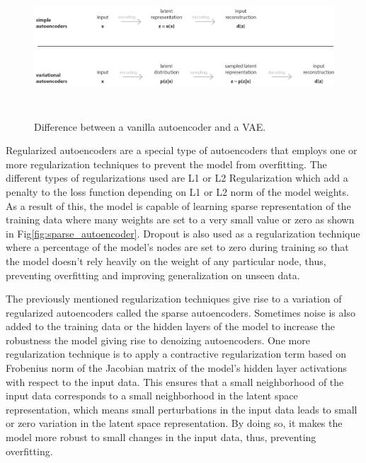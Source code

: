 \begin{figure}[t]
  \centering
  \includegraphics[width=400pt,height=150pt]{pictures/vae.png}
  \caption{Difference between a vanilla autoencoder and a \ac{VAE}.\cite{vae_image}}
  \label{fig:vae}
\end{figure} 
Regularized autoencoders are a special type of autoencoders that employs one or more regularization techniques to prevent the model from overfitting. The different types of regularizations used are L1 or L2 Regularization which add a penalty to the loss function depending on L1 or L2 norm of the model weights. As a result of this, the model is capable of learning sparse representation of the training data where many weights are set to a very small value or zero as shown in Fig\ref{fig:sparse_autoencoder}. Dropout is also used as a regularization technique where a percentage of the model's nodes are set to zero during training so that the model doesn't rely heavily on the weight of any particular node, thus, preventing overfitting and improving generalization on unseen data. 

\vspace{5mm}

The previously mentioned regularization techniques give rise to a variation of regularized autoencoders called the sparse autoencoders\cite{ng2011sparse}. Sometimes noise is also added to the training data or the hidden layers of the model to increase the robustness the model giving rise to denoizing autoencoders\cite{vincent2008extracting}. One more regularization technique is to apply a contractive regularization term based on Frobenius norm of the Jacobian matrix of the model's hidden layer activations with respect to the input data\cite{rifai2011contractive,autoencoder}. This ensures that a small neighborhood of the input data corresponds to a small neighborhood in the latent space representation, which means small perturbations in the input data leads to small or zero variation in the latent space representation\cite{rifai2011contractive,autoencoder}. By doing so, it makes the model more robust to small changes in the input data, thus, preventing overfitting.

